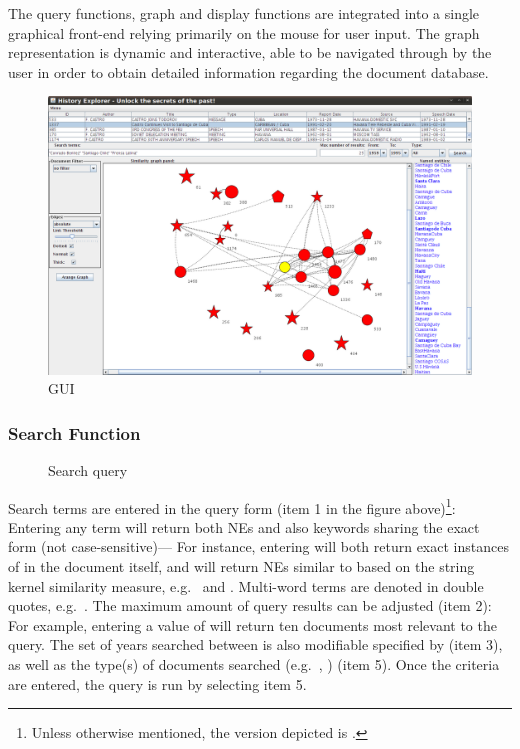 The query functions, graph and display functions are integrated into a single graphical front-end relying primarily on the mouse for user input. The graph representation is dynamic and interactive, able to be navigated through by the user in order to obtain detailed information regarding the document database.

\begin{figure}[ht]
\centering
\caption{GUI}
\includegraphics[width=160mm]{gui.png}
\end{figure}

\subsubsection{Search Function}
\begin{figure}[ht]
\centering
\caption{Search query}
\end{figure}

Search terms are entered in the query form (item 1 in the figure above)\footnote{Unless otherwise mentioned, the version depicted is .}: Entering any term will return both NEs and also keywords sharing the exact form (not case-sensitive)--- For instance, entering  will both return exact instances of  in the document itself, and will return NEs similar to  based on the string kernel similarity measure, e.g.\  and . Multi-word terms are denoted in double quotes, e.g.\ . The maximum amount of query results can be adjusted (item 2): For example, entering a value of  will return ten documents most relevant to the query. The set of years searched between is also modifiable specified by (item 3), as well as the type(s) of documents searched (e.g.\ , ) (item 5). Once the criteria are entered, the query is run by selecting item 5.

